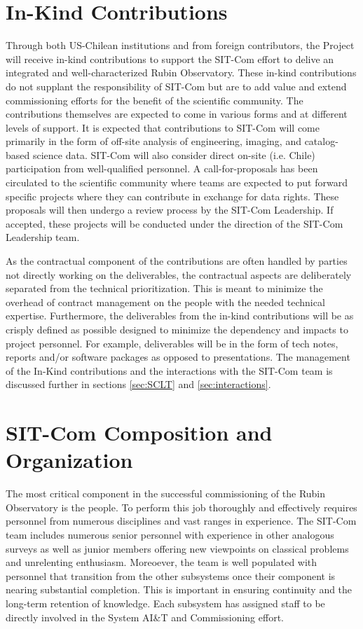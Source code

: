 \documentclass[SE,lsstdraft,authoryear,toc]{lsstdoc}
\begin{document}
\section{In-Kind Contributions}
\label{sec:in_kind}

Through both US-Chilean institutions and from foreign contributors, the Project will receive in-kind contributions to support the SIT-Com effort to delive an integrated and well-characterized Rubin Observatory.
These in-kind contributions do not supplant the responsibility of SIT-Com but are to add value and extend commissioning efforts for the benefit of the scientific community.
The contributions themselves are expected to come in various forms and at different levels of support.
It is expected that contributions to SIT-Com will come primarily in the form of off-site analysis of engineering, imaging, and catalog-based science data.
SIT-Com will also consider direct on-site (i.e. Chile) participation from well-qualified personnel.
A call-for-proposals has been circulated to the scientific community where teams are expected to put forward specific projects where they can contribute in exchange for data rights.
These proposals will then undergo a review process by the SIT-Com Leadership.
If accepted, these projects will be conducted under the direction of the SIT-Com Leadership team.

As the contractual component of the contributions are often handled by parties not directly working on the deliverables, the contractual aspects are deliberately separated from the technical prioritization.
This is meant to minimize the overhead of contract management on the people with the needed technical expertise.
Furthermore, the deliverables from the in-kind contributions will be as crisply defined as possible designed to minimize the dependency and impacts to project personnel.
For example, deliverables will be in the form of tech notes, reports and/or software packages as opposed to presentations.
The management of the In-Kind contributions and the interactions with the SIT-Com team is discussed further in sections \ref{sec:SCLT} and \ref{sec:interactions}.

\section{SIT-Com Composition and Organization}
\label{sec:comp_and_org}

The most critical component in the successful commissioning of the Rubin Observatory is the people.
To perform this job thoroughly and effectively requires personnel from numerous disciplines and vast ranges in experience.
The SIT-Com team includes numerous senior personnel with experience in other analogous surveys as well as junior members offering new viewpoints on classical problems and unrelenting enthusiasm.
Moreoever, the team is well populated with personnel that transition from the other subsystems once their component is nearing substantial completion.
This is important in ensuring continuity and the long-term retention of knowledge.
Each subsystem has assigned staff to be directly involved in the System AI\&T and Commissioning effort.
\end{document}
